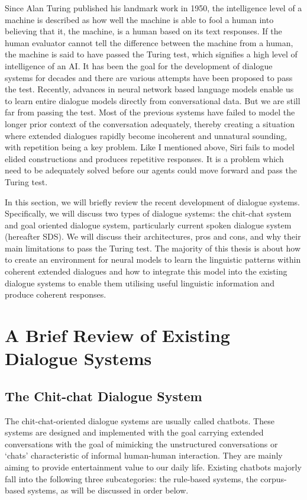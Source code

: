 \documentclass[bsc,frontabs,twoside,singlespacing,parskip,deptreport]{infthesis}     %
\begin{document}
Since Alan Turing published his landmark work in 1950\cite{turing1950computing}, the intelligence level of a machine is described as how well the machine is able to fool a human into believing that it, the machine, is a human based on its text responses. If the human evaluator cannot tell the difference between the machine from a human, the machine is said to have passed the Turing test, which signifies a high level of intelligence of an AI. It has been the goal for the development of dialogue systems for decades and there are various attempts have been proposed to pass the test. Recently, advances in neural network based language models enable us to learn entire dialogue models directly from conversational data. But we are still far from passing the test. Most of the previous systems have failed to model the longer prior context of the conversation adequately, thereby creating a situation where extended dialogues rapidly become incoherent and unnatural sounding, with repetition being a key problem. Like I mentioned above, Siri fails to model elided constructions and produces repetitive responses. It is a problem which need to be adequately solved before our agents could move forward and pass the Turing test.

In this section, we will briefly review the recent development of dialogue systems. Specifically, we will discuss two types of dialogue systems: the chit-chat system and goal oriented dialogue system, particularly current spoken dialogue system (hereafter SDS). We will discuss their architectures, pros and cons, and why their main limitations to pass the Turing test. The majority of this thesis is about how to create an environment for neural models to learn the linguistic patterns within coherent extended dialogues and how to integrate this model into the existing dialogue systems to enable them utilising useful linguistic information and produce coherent responses.

\section {A Brief Review of Existing Dialogue Systems}

\subsection{The Chit-chat Dialogue System}

The chit-chat-oriented dialogue systems are usually called chatbots. These systems are designed and implemented with the goal carrying extended conversations with the goal of mimicking the unstructured conversations or ‘chats’ characteristic of informal human-human interaction. They are mainly aiming to provide entertainment value to our daily life. Existing chatbots majorly fall into the following three subcategories: the rule-based systems, the corpus-based systems, as will be discussed in order below.
\end{document}
